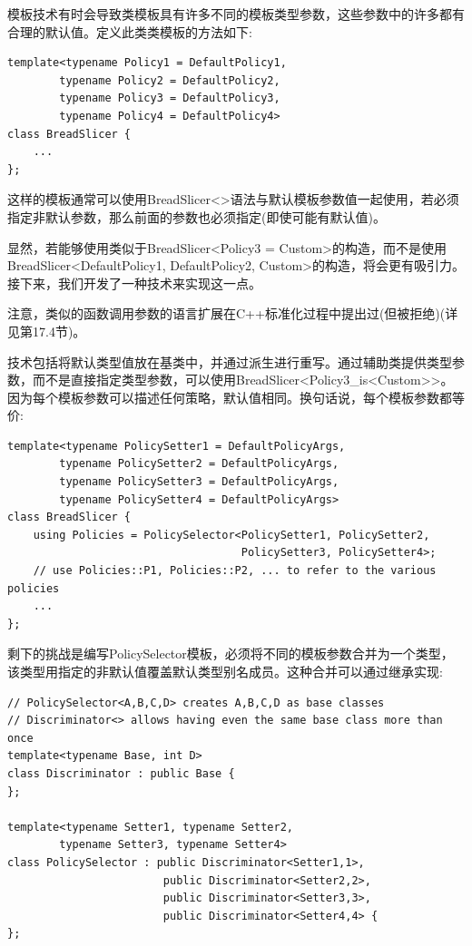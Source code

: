 模板技术有时会导致类模板具有许多不同的模板类型参数，这些参数中的许多都有合理的默认值。定义此类类模板的方法如下:

\begin{lstlisting}[style=styleCXX]
template<typename Policy1 = DefaultPolicy1,
		typename Policy2 = DefaultPolicy2,
		typename Policy3 = DefaultPolicy3,
		typename Policy4 = DefaultPolicy4>
class BreadSlicer {
	...
};
\end{lstlisting}

这样的模板通常可以使用BreadSlicer<>语法与默认模板参数值一起使用，若必须指定非默认参数，那么前面的参数也必须指定(即使可能有默认值)。

显然，若能够使用类似于BreadSlicer<Policy3 = Custom>的构造，而不是使用BreadSlicer<DefaultPolicy1, DefaultPolicy2, Custom>的构造，将会更有吸引力。接下来，我们开发了一种技术来实现这一点。

\begin{tcolorbox}[colback=webgreen!5!white,colframe=webgreen!75!black]
\hspace*{0.75cm}注意，类似的函数调用参数的语言扩展在C++标准化过程中提出过(但被拒绝)(详见第17.4节)。
\end{tcolorbox}

技术包括将默认类型值放在基类中，并通过派生进行重写。通过辅助类提供类型参数，而不是直接指定类型参数，可以使用BreadSlicer<Policy3\_is<Custom>{}>。因为每个模板参数可以描述任何策略，默认值相同。换句话说，每个模板参数都等价:

\begin{lstlisting}[style=styleCXX]
template<typename PolicySetter1 = DefaultPolicyArgs,
		typename PolicySetter2 = DefaultPolicyArgs,
		typename PolicySetter3 = DefaultPolicyArgs,
		typename PolicySetter4 = DefaultPolicyArgs>
class BreadSlicer {
	using Policies = PolicySelector<PolicySetter1, PolicySetter2,
									PolicySetter3, PolicySetter4>;
	// use Policies::P1, Policies::P2, ... to refer to the various policies
	...
};
\end{lstlisting}

剩下的挑战是编写PolicySelector模板，必须将不同的模板参数合并为一个类型，该类型用指定的非默认值覆盖默认类型别名成员。这种合并可以通过继承实现:

\begin{lstlisting}[style=styleCXX]
// PolicySelector<A,B,C,D> creates A,B,C,D as base classes
// Discriminator<> allows having even the same base class more than once
template<typename Base, int D>
class Discriminator : public Base {
};

template<typename Setter1, typename Setter2,
		typename Setter3, typename Setter4>
class PolicySelector : public Discriminator<Setter1,1>,
						public Discriminator<Setter2,2>,
						public Discriminator<Setter3,3>,
						public Discriminator<Setter4,4> {
};
\end{lstlisting}

